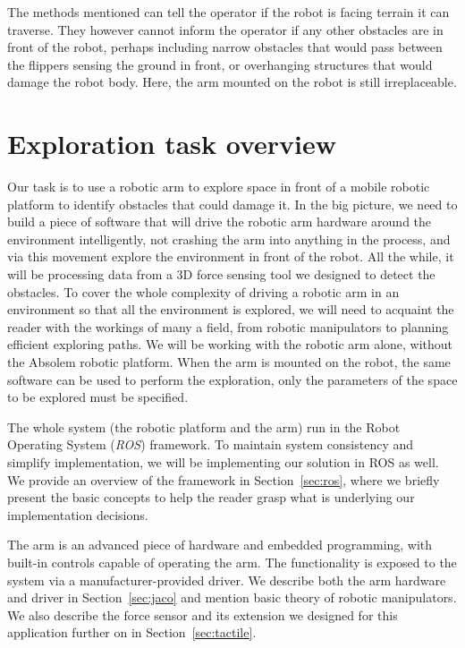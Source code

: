 \documentclass[buriama8_dp.tex]{subfiles}
\begin{document}
The methods mentioned can tell the operator if the robot is facing terrain it can traverse. They however cannot inform the operator if any other obstacles are in front of the robot, perhaps including narrow obstacles that would pass between the flippers sensing the ground in front, or overhanging structures that would damage the robot body. Here, the arm mounted on the robot is still irreplaceable.

\section{Exploration task overview}
\label{sec:label}

Our task is to use a robotic arm to explore space in front of a mobile robotic platform to identify obstacles that could damage it. In the big picture, we need to build a piece of software that will drive the robotic arm hardware around the environment intelligently, not crashing the arm into anything in the process, and via this movement explore the environment in front of the robot. All the while, it will be processing data from a 3D force sensing tool we designed to detect the obstacles. To cover the whole complexity of driving a robotic arm in an environment so that all the environment is explored, we will need to acquaint the reader with the workings of many a field, from robotic manipulators to planning efficient exploring paths. We will be working with the robotic arm alone, without the Absolem robotic platform. When the arm is mounted on the robot, the same software can be used to perform the exploration, only the parameters of the space to be explored must be specified.

The whole system (the robotic platform and the arm) run in the Robot Operating System (\emph{ROS}) framework. To maintain system consistency and simplify implementation, we will be implementing our solution in ROS as well. We provide an overview of the framework in Section~\ref{sec:ros}, where we briefly present the basic concepts to help the reader grasp what is underlying our implementation decisions.

The arm is an advanced piece of hardware and embedded programming, with built-in controls capable of operating the arm. The functionality is exposed to the system via a manufacturer-provided driver. We describe both the arm hardware and driver in Section~\ref{sec:jaco} and mention basic theory of robotic manipulators. We also describe the force sensor and its extension we designed for this application further on in Section~\ref{sec:tactile}. 
\end{document}

